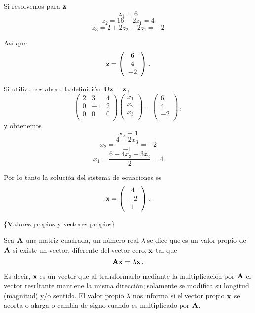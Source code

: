 \documentclass[
]{agujournal2019}
\begin{document}
\noindent Si resolvemos para \({\textbf z}\) \[z_1=6\] \[z_2=16-2z_1=4\]
\[z_3=2+2z_2-2z_1=-2\]

\noindent Así que \[{\textbf z}=\left(\begin{array}{c}
  6 \\
  4 \\
  -2 \\
        \end{array}\right)\,.\]

\noindent Si utilizamos ahora la definición
\({\textbf U}{\textbf x}={\textbf z}\,,\) \[\left(\begin{array}{ccccc}
  2 & 3 & 4\\
  0 & -1 & 2\\
  0 & 0 & 0 \\
        \end{array}\right)
    \left(\begin{array}{c}
  x_1 \\
  x_2 \\
  x_3 \\
        \end{array}\right)=
    \left(\begin{array}{c}
  6 \\
  4 \\
  -2 \\
        \end{array}\right)\,,\] \noindent y obtenemos \[x_3=1\]
\[x_2=\frac{4-2x_3}{-1}=-2\] \[x_1=\frac{6-4x_3-3x_2}{2}=4\]

\noindent Por lo tanto la solución del sistema de ecuaciones es
\[{\textbf x}=\left(\begin{array}{c}
  4 \\
  -2\\
  1 \\
        \end{array}\right)\,.\]

\vspace{0.5cm}

\{\noindent \textbf Valores propios y vectores propios\}

\noindent Sea \({\textbf A}\) una matriz cuadrada, un número real
\(\lambda\) se dice que es un valor propio de \({\textbf A}\) si existe
un vector, diferente del vector cero, \({\textbf x}\) tal que
\[{\textbf A}{\textbf x}=\lambda{\textbf x}\,.\]

\noindent Es decir, \({\textbf x}\) es un vector que al transformarlo
mediante la multiplicación por \({\textbf A}\) el vector resultante
mantiene la misma dirección; solamente se modifica su longitud
(magnitud) y/o sentido. El valor propio \(\lambda\) nos informa si el
vector propio \({\textbf x}\) se acorta o alarga o cambia de signo
cuando es multiplicado por \({\textbf A}\).
\end{document}
